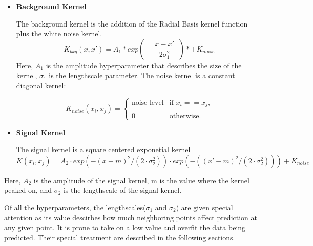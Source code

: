 %
    \begin{itemize}
        \item \textbf{Background Kernel}

            The background kernel is the addition of the Radial Basis kernel function plus the white noise kernel.
            \begin{equation}
                K_{bkg}(x, x') = A_{1} * exp(-\frac{||x-x'||}{2\sigma_{1}^{2}}) *+ K_{noise}
                \label{eq:backgroundkernel}
            \end{equation}
            Here, $A_{1}$ is the amplitude hyperparameter that describes the size of the kernel, $\sigma_{1}$ is the lengthscale parameter.
            The noise kernel is a constant diagonal kernel:
            

			\begin{equation}
            K_{noise}(x_{i}, x_{j}) =
			\begin{cases} \text{noise level} & \text{if $x_{i}==x_{j}$,} \\
			\\
            0 & \text{otherwise.}
			\end{cases}
			\end{equation}

        \item \textbf{Signal Kernel}

            The signal kernel is a square centered exponetial kernel
            \begin{equation}
            K(x_{i}, x_{j})=A_{2}\cdot exp(-(x-m)^{2}/(2\cdot\sigma_{2}^{2}))\cdot exp(-((x'-m)^{2}/(2\cdot\sigma_{2}^{2}))) + K_{noise}
            \label{eq:signalkernel}
            \end{equation}

    \end{itemize}
            Here, $A_{2}$ is the amplitude of the signal kernel, m is the value where the kernel peaked on, and $\sigma_{2}$ is the lengthscale of the signal kernel. 

	Of all the hyperparameters, the lengthscales($\sigma_{1}$ and $\sigma_{2}$) are given special attention as its value descirbes how much neighboring points affect prediction at any given point. It is prone to take on a low value and overfit the data being predicted. Their special treatment are described in the following sections.

